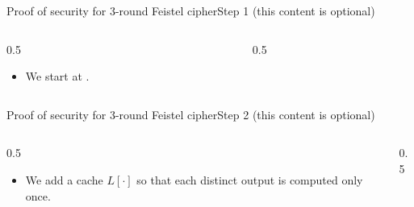 \ifdefined\PRESENTATION\else\PassOptionsToClass{handout}{beamer}\fi\documentclass[aspectratio=169, lualatex]{beamer}
\begin{document}
	\begin{frame}{Proof of security for 3-round Feistel cipher}{Step 1 (this content is optional)}
		\begin{columns}[c]
			\begin{column}{0.5\textwidth}
				\begin{itemize}
					\item We start at .
				\end{itemize}
			\end{column}
			\begin{column}{0.5\textwidth}
				\begin{center}
				\end{center}
			\end{column}
		\end{columns}
	\end{frame}

	\begin{frame}{Proof of security for 3-round Feistel cipher}{Step 2 (this content is optional)}
		\begin{columns}[c]
			\begin{column}{0.5\textwidth}
				\begin{itemize}
					\item We add a cache $L[\cdot]$ so that each distinct output is computed only once.
				\end{itemize}
			\end{column}
			\begin{column}{0.5\textwidth}
				\begin{center}
				\end{center}
			\end{column}
		\end{columns}
	\end{frame}
\end{document}
